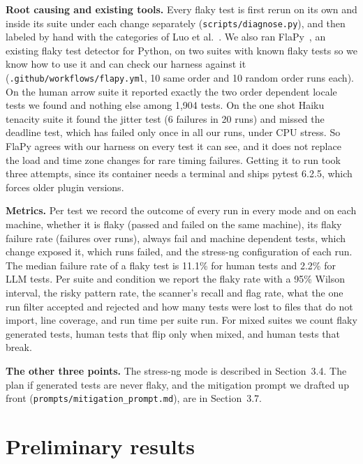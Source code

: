 \documentclass[sigconf,nonacm]{acmart}
\begin{document}
\textbf{Root causing and existing tools.} Every flaky test is first rerun on its own and inside its suite under each change separately (\texttt{scripts/diagnose.py}), and then labeled by hand with the categories of Luo et al.~\cite{luo2014}. We also ran FlaPy~\cite{gruber2021}, an existing flaky test detector for Python, on two suites with known flaky tests so we know how to use it and can check our harness against it (\texttt{.github/workflows/flapy.yml}, 10 same order and 10 random order runs each). On the human arrow suite it reported exactly the two order dependent locale tests we found and nothing else among 1,904 tests. On the one shot Haiku tenacity suite it found the jitter test (6 failures in 20 runs) and missed the deadline test, which has failed only once in all our runs, under CPU stress. So FlaPy agrees with our harness on every test it can see, and it does not replace the load and time zone changes for rare timing failures. Getting it to run took three attempts, since its container needs a terminal and ships pytest 6.2.5, which forces older plugin versions.

\textbf{Metrics.} Per test we record the outcome of every run in every mode and on each machine, whether it is flaky (passed and failed on the same machine), its flaky failure rate (failures over runs), always fail and machine dependent tests, which change exposed it, which runs failed, and the stress-ng configuration of each run. The median failure rate of a flaky test is 11.1\% for human tests and 2.2\% for LLM tests. Per suite and condition we report the flaky rate with a 95\% Wilson interval, the risky pattern rate, the scanner's recall and flag rate, what the one run filter accepted and rejected and how many tests were lost to files that do not import, line coverage, and run time per suite run. For mixed suites we count flaky generated tests, human tests that flip only when mixed, and human tests that break.

\textbf{The other three points.} The stress-ng mode is described in Section~3.4. The plan if generated tests are never flaky, and the mitigation prompt we drafted up front (\texttt{prompts/mitigation\_prompt.md}), are in Section~3.7.

\section{Preliminary results}
\end{document}
